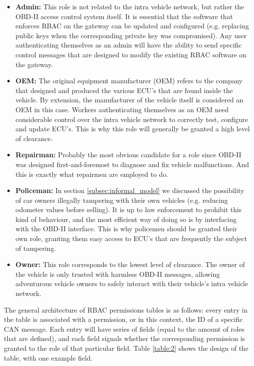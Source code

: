 \begin{itemize}
	\item \textbf{Admin:} This role is not related to the intra vehicle network, but rather the OBD-II access control system itself. It is essential that the software that enforces RBAC on the gateway can be updated and configured (e.g. replacing public keys when the corresponding private key was compromised). Any user authenticating themselves as an admin will have the ability to send specific control messages that are designed to modify the existing RBAC software on the gateway.
	
	\item \textbf{OEM:} The original equipment manufacturer (OEM) refers to the company that designed and produced the various ECU's that are found inside the vehicle. By extension, the manufacturer of the vehicle itself is considered an OEM in this case. Workers authenticating themselves as an OEM need considerable control over the intra vehicle network to correctly test, configure and update ECU's. This is why this role will generally be granted a high level of clearance.
	
	\item \textbf{Repairman:} Probably the most obvious candidate for a role since OBD-II was designed first-and-foremost to diagnose and fix vehicle malfunctions. And this is exactly what repairmen are employed to do.
	
	\item \textbf{Policeman:} In section \ref{subsec:informal_model} we discussed the possibility of car owners illegally tampering with their own vehicles (e.g. reducing odometer values before selling). It is up to law enforcement to prohibit this kind of behaviour, and the most efficient way of doing so is by interfacing with the OBD-II interface. This is why policemen should be granted their own role, granting them easy access to ECU's that are frequently the subject of tampering.
	
	\item \textbf{Owner:} This role corresponds to the lowest level of clearance. The owner of the vehicle is only trusted with harmless OBD-II messages, allowing adventurous vehicle owners to safely interact with their vehicle's intra vehicle network.
\end{itemize}
The general architecture of RBAC permissions tables is as follows: every entry in the table is associated with a permission, or in this context, the ID of a specific CAN message. Each entry will have series of fields (equal to the amount of roles that are defined), and each field signals whether the corresponding permission is granted to the role of that particular field. Table \ref{table:2} shows the design of the table, with one example field.

